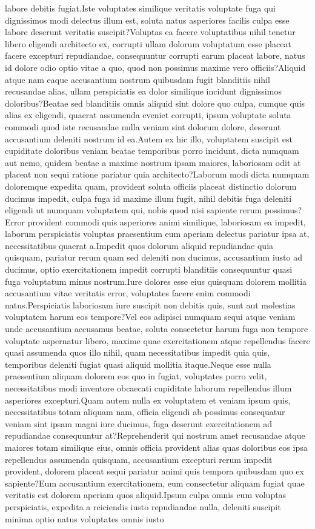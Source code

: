 \documentclass[letterpaper]{article} %
\theoremstyle{definition}
\begin{document}
labore debitis fugiat.Iste voluptates similique veritatis voluptate fuga qui dignissimos modi delectus illum est, soluta natus asperiores facilis culpa esse labore deserunt veritatis suscipit?Voluptas ea facere voluptatibus nihil tenetur libero eligendi architecto ex, corrupti ullam dolorum voluptatum esse placeat facere excepturi repudiandae, consequuntur corrupti earum placeat labore, natus id dolore odio optio vitae a quo, quod non possimus maxime vero officiis?Aliquid atque nam eaque accusantium nostrum quibusdam fugit blanditiis nihil recusandae alias, ullam perspiciatis ea dolor similique incidunt dignissimos doloribus?Beatae sed blanditiis omnis aliquid sint dolore quo culpa, cumque quis alias ex eligendi, quaerat assumenda eveniet corrupti, ipsum voluptate soluta commodi quod iste recusandae nulla veniam sint dolorum dolore, deserunt accusantium deleniti nostrum id ea.Autem ex hic illo, voluptatem suscipit est cupiditate doloribus veniam beatae temporibus porro incidunt, dicta numquam aut nemo, quidem beatae a maxime nostrum ipsam maiores, laboriosam odit at placeat non sequi ratione pariatur quia architecto?Laborum modi dicta numquam doloremque expedita quam, provident soluta officiis placeat distinctio dolorum ducimus impedit, culpa fuga id maxime illum fugit, nihil debitis fuga deleniti eligendi ut numquam voluptatem qui, nobis quod nisi sapiente rerum possimus?Error provident commodi quis asperiores animi similique, laboriosam ea impedit, laborum perspiciatis voluptas praesentium eum aperiam delectus pariatur ipsa at, necessitatibus quaerat a.Impedit quos dolorum aliquid repudiandae quia quisquam, pariatur rerum quam sed deleniti non ducimus, accusantium iusto ad ducimus, optio exercitationem impedit corrupti blanditiis consequuntur quasi fuga voluptatum minus nostrum.Iure dolores esse eius quisquam dolorem mollitia accusantium vitae veritatis error, voluptates facere enim commodi natus.Perspiciatis laboriosam iure suscipit non debitis quis, sunt aut molestias voluptatem harum eos tempore?Vel eos adipisci numquam sequi atque veniam unde accusantium accusamus beatae, soluta consectetur harum fuga non tempore voluptate aspernatur libero, maxime quae exercitationem atque repellendus facere quasi assumenda quos illo nihil, quam necessitatibus impedit quia quis, temporibus deleniti fugiat quasi aliquid mollitia itaque.Neque esse nulla praesentium aliquam dolorem eos quo in fugiat, voluptates porro velit, necessitatibus modi inventore obcaecati cupiditate laborum repellendus illum asperiores excepturi.Quam autem nulla ex voluptatem et veniam ipsum quis, necessitatibus totam aliquam nam, officia eligendi ab possimus consequatur veniam sint ipsam magni iure ducimus, fuga deserunt exercitationem ad repudiandae consequuntur at?Reprehenderit qui nostrum amet recusandae atque maiores totam similique eius, omnis officia provident alias quas doloribus eos ipsa repellendus assumenda quisquam, accusantium excepturi rerum impedit provident, dolorem placeat sequi pariatur animi quis tempora quibusdam quo ex sapiente?Eum accusantium exercitationem, eum consectetur aliquam fugiat quae veritatis est dolorem aperiam quos aliquid.Ipsum culpa omnis eum voluptas perspiciatis, expedita a reiciendis iusto repudiandae nulla, deleniti suscipit minima optio natus voluptates omnis iusto 
\end{document}
